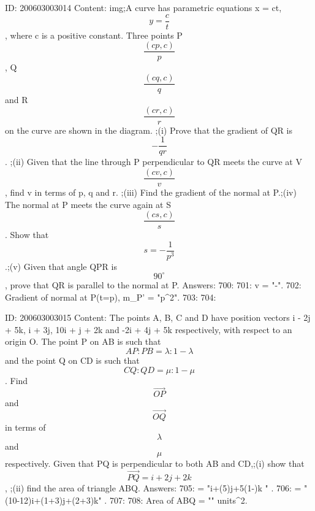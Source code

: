 \documentclass{article}
\begin{document}
ID: 200603003014
Content:
img;A curve has parametric equations x = ct, $$y=\frac{c}{t} $$, where c is a positive constant. Three points P $$\frac{(cp,c)}{p}$$, Q $$\frac{(cq,c)}{q}$$ and R $$\frac{(cr,c)}{r}$$ on the curve are shown in the diagram. ;(i) Prove that the gradient of QR is $$- \frac{1}{qr} $$.  ;(ii) Given that the line through P perpendicular to QR meets the curve at V $$\frac{(cv,c)}{v}$$ , find v in terms of p, q and r. ;(iii) Find the gradient of the normal at P.;(iv) The normal at P meets the curve again at S $$\frac{(cs,c)}{s}$$. Show that $$s= - \frac{1}{p^{3}} $$.;(v) Given that angle QPR is $$90^{\circ}$$, prove that QR is parallel to the normal at P.  Answers:
700: 
701: v = "-".
702: Gradient of normal at  P(t=p), m_P' = "p^2".
703: 
704: 

ID: 200603003015
Content:
The points A, B, C and D have position vectors i - 2j + 5k, i + 3j, 10i + j + 2k and -2i + 4j + 5k respectively, with respect to an origin O. The point P on AB is such that $$AP:PB= \lambda :1- \lambda $$ and the point Q on CD is such that $$CQ:QD= \mu :1- \mu $$. Find $$ \vec {OP}$$ and $$ \vec {OQ}$$ in terms of $$\lambda$$ and $$\mu$$ respectively. Given that PQ is perpendicular to both AB and CD,;(i) show that $$ \vec {PQ} =i+2j+2k$$, ;(ii) find the area of triangle ABQ. Answers:
705:   = "i+(5)j+5(1-\lambda)k " .
706:  = "(10-12\mu)i+(1+3\mu)j+(2+3\mu)k" .
707: 
708: Area of \Delta ABQ = "" units^2.
\end{document}
